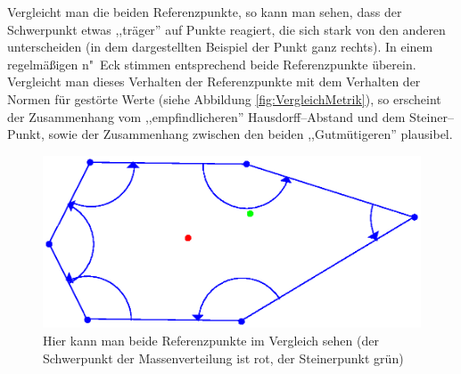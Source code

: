Vergleicht man die beiden Referenzpunkte, so kann man sehen, dass der Schwerpunkt etwas ,,träger'' auf Punkte reagiert, die sich stark von den anderen unterscheiden (in dem dargestellten Beispiel der Punkt ganz rechts). In einem regelmäßigen n"~Eck stimmen entsprechend beide Referenzpunkte überein. Vergleicht man dieses Verhalten der Referenzpunkte mit dem Verhalten der Normen für gestörte Werte (siehe Abbildung \vref{fig:VergleichMetrik}), so erscheint der Zusammenhang vom ,,empfindlicheren'' Hausdorff--Abstand und dem  Steiner--Punkt, sowie der Zusammenhang zwischen den beiden ,,Gutmütigeren'' plausibel.

\begin{figure}
	\centering
	\includegraphics[scale=.8]{Referenzpunkte.eps}
	\caption[Vergleich beider Referenzpunkte]{Hier kann man beide Referenzpunkte im Vergleich sehen (der Schwerpunkt der Massenverteilung ist rot, der Steinerpunkt grün) }
	\label{fig:Referenzpunkte}
\end{figure}


